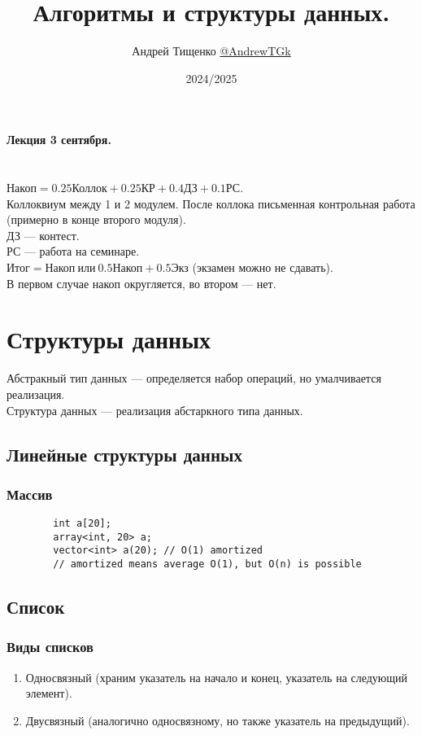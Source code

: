 \documentclass[12pt, a4paper]{article}
\title{Алгоритмы и структуры данных.}
\author{Андрей Тищенко \href{https://t.me/AndrewTGk}{@AndrewTGk}}
\date{2024/2025}
\begin{document}
  \maketitle
  \tableofcontents
    \begin{center}
        \textbf{Лекция 3 сентября.}
    \end{center}
    \section*{}
    $\text{Накоп} = 0.25\text{Коллок} + 0.25\text{КР} + 0.4\text{ДЗ} + 0.1\text{РС}$.\\
    Коллоквиум между 1 и 2 модулем. После коллока 
    письменная контрольная работа (примерно в конце 
    второго модуля).\\
    ДЗ --- контест.\\ 
    РС --- работа на семинаре.\\
    $\text{Итог} = \text{Накоп}\ \text{или}\ 0.5\text{Накоп} + 0.5\text{Экз}$ (экзамен можно не сдавать).\\
    В первом случае накоп округляется, во втором --- нет.
    \section{Структуры данных}
    $\textit{Абстракный тип данных}$ --- определяется набор операций, 
    но умалчивается реализация.\\
    $\textit{Структура данных}$ --- реализация абстаркного типа данных.
    \subsection{Линейные структуры данных}
    \subsubsection*{Массив}
    \begin{lstlisting}
        int a[20];
        array<int, 20> a;
        vector<int> a(20); // O(1) amortized 
        // amortized means average O(1), but O(n) is possible
    \end{lstlisting}
    \subsection{Список}
        \subsubsection*{Виды списков}
        \begin{enumerate}
            \item Односвязный (храним указатель на начало и конец, указатель на следующий элемент).
            \item Двусвязный (аналогично односвязному, но также указатель на предыдущий).
        \end{enumerate}
\end{document}
